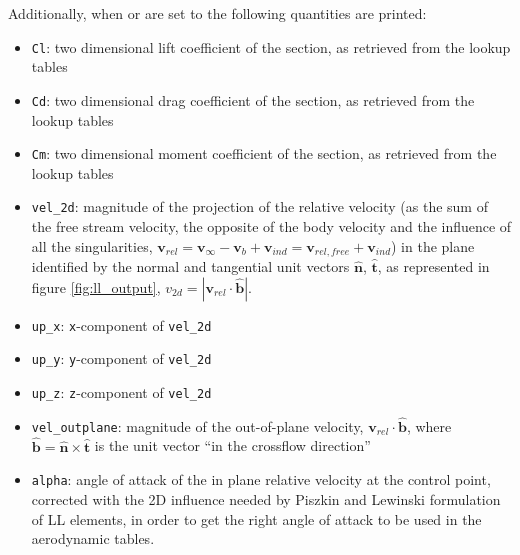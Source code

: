 Additionally, when  or  
are set to  the following quantities are printed:
\begin{itemize}
    \item \texttt{Cl}: two dimensional lift coefficient of the section, 
    as retrieved from the lookup tables
    \item \texttt{Cd}: two dimensional drag coefficient of the section, 
    as retrieved from the lookup tables
    \item \texttt{Cm}: two dimensional moment coefficient of the section, 
    as retrieved from the lookup tables
    \item \texttt{vel\_2d}: magnitude of the projection of the relative 
    velocity (as the sum of the free stream velocity, the opposite of 
    the body velocity and the influence of all the singularities, 
    $\mathbf{v}_{rel} = \mathbf{v}_\infty - \mathbf{v}_b + 
    \mathbf{v}_{ind} = \mathbf{v}_{rel,free} + \mathbf{v}_{ind}$) 
    in the plane identified by the normal and tangential unit vectors 
    $\mathbf{\hat{n}}$, $\mathbf{\hat{t}}$, as represented in figure \ref{fig:ll_output},
    $v_{2d} = | \mathbf{v}_{rel} \cdot \mathbf{\hat{b}}|$.
    \item \texttt{up\_x}: \texttt{x}-component of \texttt{vel\_2d} 
    \item \texttt{up\_y}: \texttt{y}-component of \texttt{vel\_2d}
    \item \texttt{up\_z}: \texttt{z}-component of \texttt{vel\_2d}  
    \item \texttt{vel\_outplane}: magnitude of the out-of-plane velocity, 
    $\mathbf{v}_{rel} \cdot \mathbf{\hat{b}}$, where 
    $\mathbf{\hat{b}} = \mathbf{\hat{n}} \times \mathbf{\hat{t}}$ 
    is the unit vector ``in the crossflow direction''
    \item \texttt{alpha}: angle of attack of the in plane relative 
    velocity at the control point, corrected with the 2D influence 
    needed by Piszkin and Lewinski formulation of LL elements, 
    in order to get the right angle of attack to be used in the 
    aerodynamic tables.
\end{itemize}


